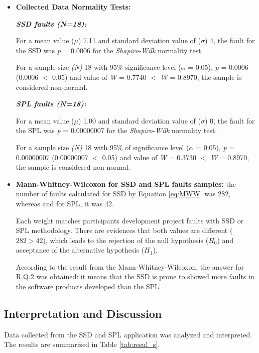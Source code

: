 \begin{itemize}

\item \textbf{Collected Data Normality Tests:} 

\textbf{\textit{SSD faults (\textit{N}=18):}}

For a mean value ($\mu$) 7.11 and standard deviation value of ($\sigma$) 4, the fault for the SSD was \textit{p} = 0.0006 for the \textit{Shapiro-Wilk} normality test.

For a sample size \textit{(N)} 18 with 95\% significance level ($\alpha$ = 0.05), \textit{p} = 0.0006 (0.0006 $<$ 0.05) and value of \textit{W} = 0.7740 $<$ \textit{W} = 0.8970, the sample is considered non-normal.

\textbf{\textit{SPL faults (\textit{N}=18):}}

For a mean value ($\mu$) 1.00 and standard deviation value of ($\sigma$) 0, the fault for the SPL was \textit{p} = 0.00000007 for the \textit{Shapiro-Wilk} normality test.

For a sample size \textit{(N)} 18 with 95\% of significance level ($\alpha$ = 0.05), \textit{p} = 0.00000007 (0.00000007 $<$ 0.05) and value of \textit{W} = 0.3730 $<$ \textit{W} = 0.8970, the sample is considered non-normal.

\item \textbf{Mann-Whitney-Wilcoxon for SSD and SPL faults samples:} the number of faults calculated for SSD by Equation \ref{eq:MWW} was 282, whereas and for SPL, it was 42.

Each weight matches participants development project faults with SSD or SPL methodology. There are evidences that both values are different ($282>42$), which leads to the rejection of the null hypothesis ($H_0$) and acceptance of the alternative hypothesis ($H_{1}$).

According to the result from the Mann-Whitney-Wilcoxon, the answer for R.Q.2 was obtained: it means that the SSD is prone to showed more faults in the software products developed than the SPL.

\end{itemize}

\subsection{Interpretation and Discussion}\label{sub:interpretation}

Data collected from the SSD and SPL application was analyzed and interpreted. The results are summarized in Table \ref{tab:resul_s}.

